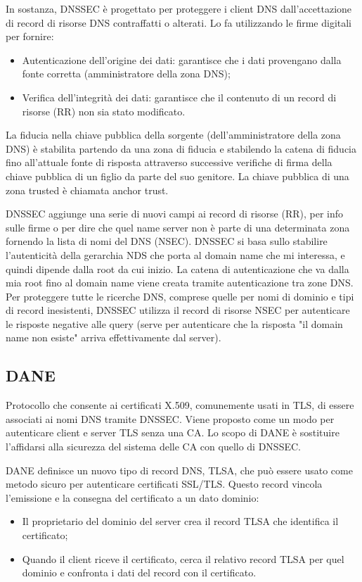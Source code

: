 In sostanza, DNSSEC è progettato per proteggere i client DNS dall'accettazione di record di risorse DNS contraffatti o alterati. Lo fa utilizzando le firme digitali per fornire:
\begin{itemize}
    \item Autenticazione dell'origine dei dati: garantisce che i dati provengano dalla fonte corretta (amministratore della zona DNS);
	\item Verifica dell'integrità dei dati: garantisce che il contenuto di un record di risorse (RR) non sia stato modificato.
\end{itemize}

La fiducia nella chiave pubblica della sorgente (dell'amministratore della zona DNS) è stabilita partendo da una zona di fiducia e stabilendo la catena di fiducia fino all'attuale fonte di risposta attraverso successive verifiche di firma della chiave pubblica di un figlio da parte del suo genitore. La chiave pubblica di una zona trusted è chiamata anchor trust.

DNSSEC aggiunge una serie di nuovi campi ai record di risorse (RR), per info sulle firme o per dire che quel name server non è parte di una determinata zona fornendo la lista di nomi del DNS (NSEC).
DNSSEC si basa sullo stabilire l'autenticità della gerarchia NDS che porta al domain name che mi interessa, e quindi dipende dalla root da cui inizio. La catena di autenticazione che va dalla mia root fino al domain name viene creata tramite autenticazione tra zone DNS. Per proteggere tutte le ricerche DNS, comprese quelle per nomi di dominio e tipi di record inesistenti, DNSSEC utilizza il record di risorse NSEC per autenticare le risposte negative alle query (serve per autenticare che la risposta "il domain name non esiste" arriva effettivamente dal server).

\subsection{DANE}

Protocollo che consente ai certificati X.509, comunemente usati in TLS, di essere associati ai nomi DNS tramite DNSSEC. Viene proposto come un modo per autenticare client e server TLS senza una CA. Lo scopo di DANE è sostituire l'affidarsi alla sicurezza del sistema delle CA con quello di DNSSEC.

DANE definisce un nuovo tipo di record DNS, TLSA, che può essere usato come metodo sicuro per autenticare certificati SSL/TLS. Questo record vincola l'emissione e la consegna del certificato a un dato dominio:
\begin{itemize}
    \item Il proprietario del dominio del server crea il record TLSA che identifica il certificato;
	\item Quando il client riceve il certificato, cerca il relativo record TLSA per quel dominio e confronta i dati del record con il certificato.
\end{itemize}

